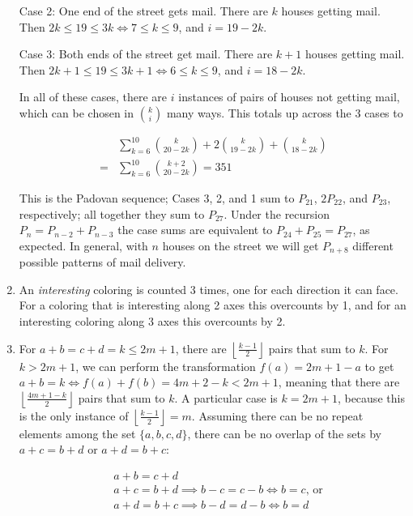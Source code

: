 \documentclass{book}
\numberwithin{equation}{section}
\begin{document}
\begin{enumerate}[label={9.\arabic*}]
Case 2: One end of the street gets mail. There are $k$ houses
getting mail. Then $2k \leq 19 \leq 3k \iff 7 \leq k \leq 9$, and $i = 19 - 2k$.

Case 3: Both ends of the street get mail. There are $k+1$ houses getting mail.
Then $2k+1 \leq 19 \leq 3k+1 \iff 6 \leq k \leq 9$, and $i = 18 - 2k$.

In all of these cases, there are $i$ instances of pairs of houses not getting mail, which can be chosen in ${k \choose i}$
many ways. This totals up across the 3 cases to

\begin{align*}
& \sum_{k=6}^{10} {k \choose 20-2k} + 2{k \choose 19-2k} + {k \choose 18-2k} \\
= & \sum_{k=6}^{10} {k+2 \choose 20-2k} = 351
\end{align*}

This is the Padovan sequence; Cases 3, 2, and 1 sum to $P_{21}$, $2P_{22}$, and $P_{23}$, respectively; all together
they sum to $P_{27}$. Under the recursion $P_n = P_{n-2} + P_{n-3}$ the case sums are equivalent to
$P_{24} + P_{25} = P_{27}$, as expected. In general, with $n$ houses on the street we will get $P_{n+8}$ different
possible patterns of mail delivery.

\item
An \emph{interesting} coloring is counted 3 times, one for each direction it can face. For a coloring that is interesting
along 2 axes this overcounts by 1, and for an interesting coloring along 3 axes this overcounts by 2.

\item
For $a + b = c + d = k \leq 2m + 1$, there are $\left \lfloor \frac{k-1}{2} \right \rfloor$ pairs that sum to $k$. For $k > 2m+1$, we
can perform the transformation $f(a) = 2m + 1 - a$ to get $a + b = k \iff f(a) + f(b) = 4m + 2 - k < 2m+1$, meaning that there
are $\left \lfloor \frac{4m + 1 - k}{2} \right \rfloor$ pairs that sum to $k$. A particular case is $k = 2m+1$, because this is
the only instance of $\left \lfloor \frac{k-1}{2} \right \rfloor = m$. Assuming there can be no repeat elements among the set $\{ a, b, c, d \}$, there can be no overlap of the sets by
$a + c = b + d$ or $a + d = b + c$:

\begin{align*}
& a + b = c + d \\
& a + c = b + d \implies b - c = c - b \iff b = c \text{, or} \\
& a + d = b + c \implies b - d = d - b \iff b = d
\end{align*}


\end{enumerate}
\end{document}
